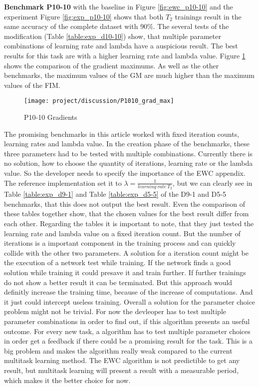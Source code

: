 \textbf{Benchmark P10-10} with the baseline in Figure \ref{fig:ewc_p10-10} and the experiment Figure \ref{fig:exp_p10-10} shows that both $T_2$ trainings result in the same accuracy of the complete dataset with 90\%.
\newline
The several tests of the modification (Table \ref{table:exp_d10-10}) show, that multiple parameter combinations of learning rate and lambda have a auspicious result.
The best results for this task are with a higher learning rate and lambda value.
\newline
Figure \ref{fig:dis_d1010} shows the comparison of the gradient maximums.
As well as the other benchmarks, the maximum values of the GM are much higher than the maximum values of the FIM.

\begin{figure}[H]
    \centering
    \texttt{[image: project/discussion/P1010\_grad\_max]}
    \caption{P10-10 Gradients}
    \label{fig:dis_d1010}
\end{figure}

The promising benchmarks in this article worked with fixed iteration counts, learning rates and lambda value.
In the creation phase of the benchmarks, these three parameters had to be tested with multiple combinations.
Currently there is no solution, how to choose the quantity of iterations, learning rate or the lambda value.
So the developer needs to specify the importance of the EWC appendix.
The reference implementation set it to $\lambda = \frac{1}{learning \: rate \: T_2 }$, but we can clearly see in Table \ref{table:exp_d9-1} and Table \ref{table:exp_d5-5} of the D9-1 and D5-5 benchmarks, that this does not output the best result.
Even the comparison of these tables together show, that the chosen values for the best result differ from each other.
Regarding the tables it is important to note, that they just tested the learning rate and lambda value on a fixed iteration count.
But the number of iterations is a important component in the training process and can quickly collide with the other two parameters.
A solution for a iteration count might be the execution of a network test while training.
If the network finds a good solution while training it could presave it and train further.
If further trainings do not show a better result it can be terminated.
But this approach would definitly increase the training time, because of the increase of computations.
And it just could intercept useless training.
Overall a solution for the parameter choice problem might not be trivial.
\newline
For now the devleoper has to test multiple parameter combinations in order to find out, if this algorithm presents an useful outcome.
For every new task, a algorithm has to test multiple parameter choices in order get a feedback if there could be a promising result for the task.
This is a big problem and makes the algorithm really weak compared to the current multitask learning method.
The EWC algorithm is not predictible to get any result, but multitask learning will present a result with a measurable period, which makes it the better choice for now.

